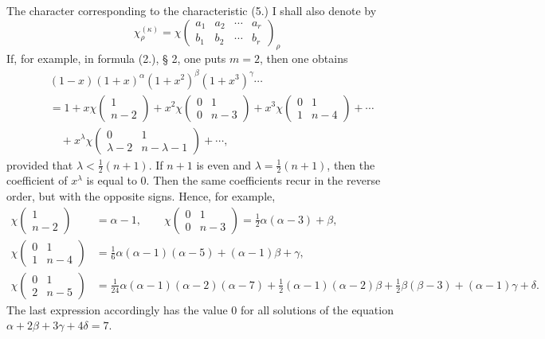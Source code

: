 \documentclass[11pt]{article}
\begin{document}
The character corresponding to the characteristic (5.) I shall also denote by
\[
 \chi_\rho^{(\kappa)}=\chi\left(\begin{matrix}a_1&a_2&\cdots&a_r\\ b_1&b_2&\cdots&b_r\end{matrix}\right)_\rho
\]
If, for example, in formula (2.), § 2, one puts $m=2$, then one obtains
\begin{equation}\tag{10.}
\begin{aligned}
 &(1-x)(1+x)^\alpha(1+x^2)^\beta(1+x^3)^\gamma\cdots\\
 &=1+x\chi\left(\begin{matrix}1\\ n-2\end{matrix}\right)
 +x^2\chi\left(\begin{matrix}0&1\\0&n-3\end{matrix}\right)
 +x^3\chi\left(\begin{matrix}0&1\\1&n-4\end{matrix}\right)+\cdots\\
 &\quad +x^\lambda\chi\left(\begin{matrix}0&1\\ \lambda-2&n-\lambda-1\end{matrix}\right)+\cdots,
\end{aligned}
\end{equation}
provided that $\lambda<\frac12(n+1)$. If $n+1$ is even and $\lambda=\frac12(n+1)$, then the coefficient of $x^\lambda$ is equal to $0$. Then the same coefficients recur in the reverse order, but with the opposite signs. Hence, for example,
\begin{equation}\tag{11.}
\begin{aligned}
\chi\left(\begin{matrix}1\\ n-2\end{matrix}\right)&=\alpha-1,\qquad
\chi\left(\begin{matrix}0&1\\0&n-3\end{matrix}\right)=\frac12\alpha(\alpha-3)+\beta,\\
\chi\left(\begin{matrix}0&1\\1&n-4\end{matrix}\right)&=\frac16\alpha(\alpha-1)(\alpha-5)+(\alpha-1)\beta+
\gamma,\\
\chi\left(\begin{matrix}0&1\\2&n-5\end{matrix}\right)&=\frac1{24}\alpha(\alpha-1)(\alpha-2)(\alpha-7)
 +\frac12(\alpha-1)(\alpha-2)\beta+\frac12\beta(\beta-3)+(\alpha-1)\gamma+
\delta.
\end{aligned}
\end{equation}
The last expression accordingly has the value $0$ for all solutions of the equation $\alpha+2\beta+3\gamma+4\delta=7$.
\end{document}
